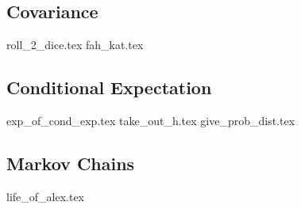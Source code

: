 \documentclass{exam}
\begin{document}
\subsection{Covariance}
\begin{enumerate}
{roll_2_dice.tex}
{fah_kat.tex}
\end{enumerate}
\subsection{Conditional Expectation}
\begin{enumerate}
{exp_of_cond_exp.tex}
{take_out_h.tex}
{give_prob_dist.tex}
\end{enumerate}
\subsection{Markov Chains}
\begin{enumerate}
{life_of_alex.tex}
\end{enumerate}
\end{document}
